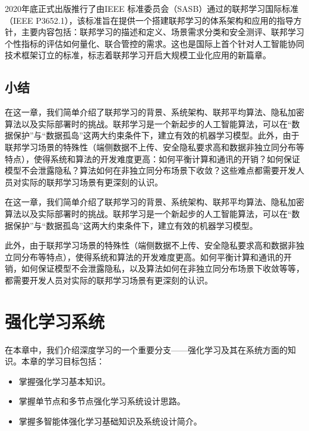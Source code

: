 \documentclass[letterpaper,10pt,english]{sphinxmanual}
\begin{document}
\sphinxAtStartPar
2020年底正式出版推行了由IEEE
标准委员会（SASB）通过的联邦学习国际标准（IEEE
P3652.1），该标准旨在提供一个搭建联邦学习的体系架构和应用的指导方针，主要内容包括：联邦学习的描述和定义、场景需求分类和安全测评、联邦学习个性指标的评估如何量化、联合管控的需求。这也是国际上首个针对人工智能协同技术框架订立的标准，标志着联邦学习开启大规模工业化应用的新篇章。


\section{小结}
\label{\detokenize{chapter_federated_learning/summary:id1}}\label{\detokenize{chapter_federated_learning/summary::doc}}
\sphinxAtStartPar
在这一章，我们简单介绍了联邦学习的背景、系统架构、联邦平均算法、隐私加密算法以及实际部署时的挑战。联邦学习是一个新起步的人工智能算法，可以在“数据保护”与“数据孤岛”这两大约束条件下，建立有效的机器学习模型。此外，由于联邦学习场景的特殊性（端侧数据不上传、安全隐私要求高和数据非独立同分布等特点），使得系统和算法的开发难度更高：如何平衡计算和通讯的开销？如何保证模型不会泄露隐私？算法如何在非独立同分布场景下收敛？这些难点都需要开发人员对实际的联邦学习场景有更深刻的认识。

\sphinxAtStartPar
在这一章，我们简单介绍了联邦学习的背景、系统架构、联邦平均算法、隐私加密算法以及实际部署时的挑战。联邦学习是一个新起步的人工智能算法，可以在“数据保护”与“数据孤岛”这两大约束条件下，建立有效的机器学习模型。

\sphinxAtStartPar
此外，由于联邦学习场景的特殊性（端侧数据不上传、安全隐私要求高和数据非独立同分布等特点），使得系统和算法的开发难度更高。如何平衡计算和通讯的开销，如何保证模型不会泄露隐私，以及算法如何在非独立同分布场景下收敛等等，都需要开发人员对实际的联邦学习场景有更深刻的认识。


\chapter{强化学习系统}
\label{\detokenize{chapter_reinforcement_learning/index:id1}}\label{\detokenize{chapter_reinforcement_learning/index::doc}}
\sphinxAtStartPar
在本章中，我们介绍深度学习的一个重要分支——强化学习及其在系统方面的知识。本章的学习目标包括：
\begin{itemize}
\item {} 
\sphinxAtStartPar
掌握强化学习基本知识。

\item {} 
\sphinxAtStartPar
掌握单节点和多节点强化学习系统设计思路。

\item {} 
\sphinxAtStartPar
掌握多智能体强化学习基础知识及系统设计简介。

\end{itemize}
\end{document}
